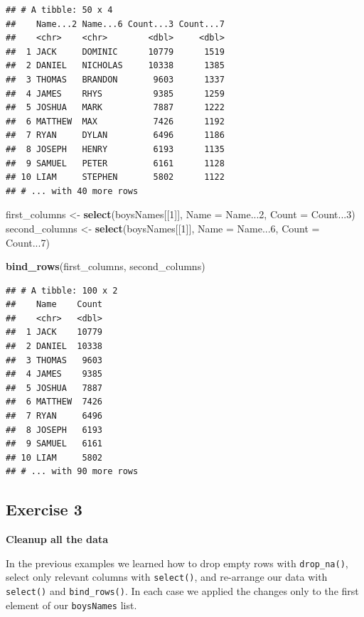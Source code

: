 \documentclass[]{book}
\newenvironment{Shaded}{\begin{snugshade}}{\end{snugshade}}
\newcommand{\DataTypeTok}[1]{\textcolor[rgb]{0.13,0.29,0.53}{#1}}
\newcommand{\DecValTok}[1]{\textcolor[rgb]{0.00,0.00,0.81}{#1}}
\newcommand{\KeywordTok}[1]{\textcolor[rgb]{0.13,0.29,0.53}{\textbf{#1}}}
\newcommand{\NormalTok}[1]{#1}
\newcommand{\StringTok}[1]{\textcolor[rgb]{0.31,0.60,0.02}{#1}}
\begin{document}
\begin{verbatim}
## # A tibble: 50 x 4
##    Name...2 Name...6 Count...3 Count...7
##    <chr>    <chr>        <dbl>     <dbl>
##  1 JACK     DOMINIC      10779      1519
##  2 DANIEL   NICHOLAS     10338      1385
##  3 THOMAS   BRANDON       9603      1337
##  4 JAMES    RHYS          9385      1259
##  5 JOSHUA   MARK          7887      1222
##  6 MATTHEW  MAX           7426      1192
##  7 RYAN     DYLAN         6496      1186
##  8 JOSEPH   HENRY         6193      1135
##  9 SAMUEL   PETER         6161      1128
## 10 LIAM     STEPHEN       5802      1122
## # ... with 40 more rows
\end{verbatim}

\begin{Shaded}
\begin{Highlighting}[]
\NormalTok{first_columns <-}\StringTok{ }\KeywordTok{select}\NormalTok{(boysNames[[}\DecValTok{1}\NormalTok{]], }\DataTypeTok{Name =}\NormalTok{ Name...}\DecValTok{2}\NormalTok{, }\DataTypeTok{Count =}\NormalTok{ Count...}\DecValTok{3}\NormalTok{)}
\NormalTok{second_columns <-}\StringTok{ }\KeywordTok{select}\NormalTok{(boysNames[[}\DecValTok{1}\NormalTok{]], }\DataTypeTok{Name =}\NormalTok{ Name...}\DecValTok{6}\NormalTok{, }\DataTypeTok{Count =}\NormalTok{ Count...}\DecValTok{7}\NormalTok{)}

\KeywordTok{bind_rows}\NormalTok{(first_columns, second_columns)}
\end{Highlighting}
\end{Shaded}

\begin{verbatim}
## # A tibble: 100 x 2
##    Name    Count
##    <chr>   <dbl>
##  1 JACK    10779
##  2 DANIEL  10338
##  3 THOMAS   9603
##  4 JAMES    9385
##  5 JOSHUA   7887
##  6 MATTHEW  7426
##  7 RYAN     6496
##  8 JOSEPH   6193
##  9 SAMUEL   6161
## 10 LIAM     5802
## # ... with 90 more rows
\end{verbatim}

\hypertarget{exercise-3-3}{%
\subsection{Exercise 3}\label{exercise-3-3}}

\textbf{Cleanup all the data}

In the previous examples we learned how to drop empty rows with
\texttt{drop\_na()}, select only relevant columns with \texttt{select()}, and re-arrange
our data with \texttt{select()} and \texttt{bind\_rows()}. In each case we applied the
changes only to the first element of our \texttt{boysNames} list.
\end{document}

